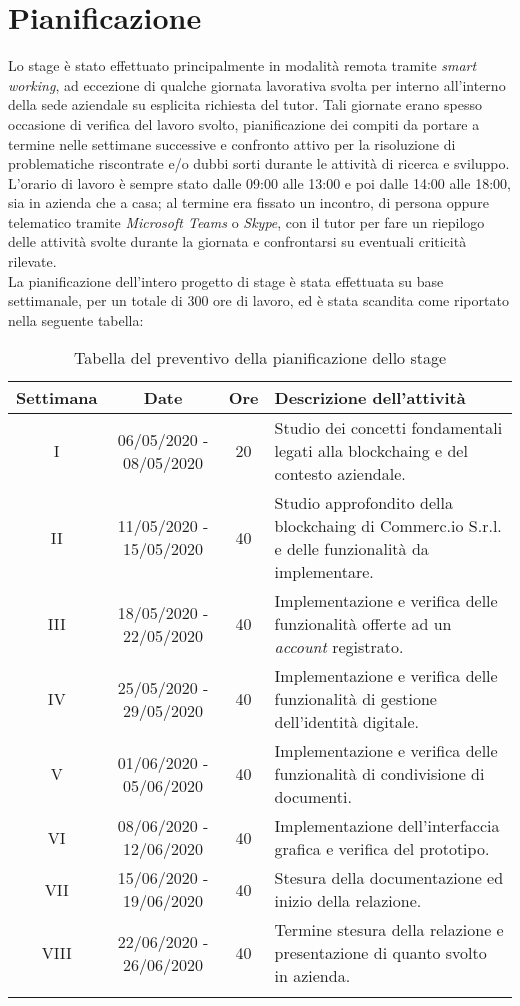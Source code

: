 \section{Pianificazione}

Lo stage è stato effettuato principalmente in modalità remota tramite \textit{smart working}, ad eccezione di qualche giornata lavorativa svolta per interno all'interno della sede aziendale su esplicita richiesta del tutor. Tali giornate erano spesso occasione di verifica del lavoro svolto, pianificazione dei compiti da portare a termine nelle settimane successive e confronto attivo per la risoluzione di problematiche riscontrate e/o dubbi sorti durante le attività di ricerca e sviluppo.\\
L'orario di lavoro è sempre stato dalle 09:00 alle 13:00 e poi dalle 14:00 alle 18:00, sia in azienda che a casa; al termine era fissato un incontro, di persona oppure telematico tramite \textit{Microsoft Teams} o \textit{Skype}, con il tutor per fare un riepilogo delle attività svolte durante la giornata e confrontarsi su eventuali criticità rilevate.\\
La pianificazione dell'intero progetto di stage è stata effettuata su base settimanale, per un totale di 300 ore di lavoro, ed è stata scandita come riportato nella seguente tabella:

\begin{longtable}{|c|c|c|p{5cm}|}
	\hline
	\rowcolor{gray}
	\textbf{Settimana} & \textbf{Date} & \textbf{Ore} & \textbf{Descrizione dell'attività} \\\hline
	I & 06/05/2020 - 08/05/2020 & 20 & Studio dei concetti fondamentali legati alla \gls{blockchaing} e del contesto aziendale. \\\hline
	II & 11/05/2020 - 15/05/2020 & 40 & Studio approfondito della \gls{blockchaing} di Commerc.io S.r.l. e delle funzionalità da implementare. \\\hline
	III & 18/05/2020 - 22/05/2020 & 40 & Implementazione e verifica delle funzionalità offerte ad un \textit{account} registrato. \\\hline
	IV & 25/05/2020 - 29/05/2020 & 40 & Implementazione e verifica delle funzionalità di gestione dell'identità digitale. \\\hline
	V & 01/06/2020 - 05/06/2020 & 40 & Implementazione e verifica delle funzionalità di condivisione di documenti. \\\hline
	VI & 08/06/2020 - 12/06/2020 & 40 & Implementazione dell'interfaccia grafica e verifica del prototipo. \\\hline
	VII & 15/06/2020 - 19/06/2020 & 40 & Stesura della documentazione ed inizio della relazione. \\\hline
	VIII & 22/06/2020 - 26/06/2020 & 40 & Termine stesura della relazione e presentazione di quanto svolto in azienda. \\\hline
	
	\caption{Tabella del preventivo della pianificazione dello stage}
	\label{tab:pianificazione}
\end{longtable}

